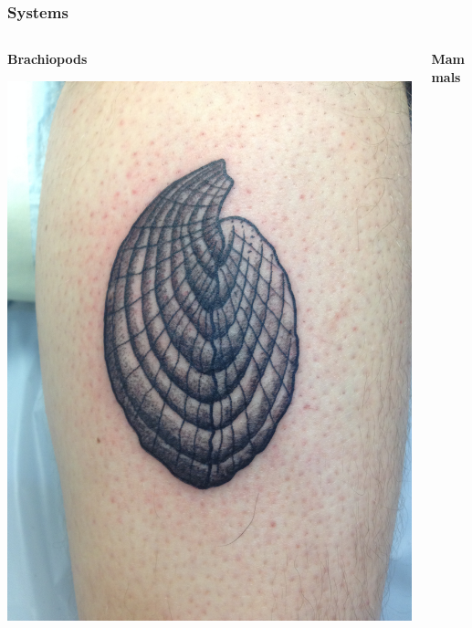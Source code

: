 \documentclass{beamer}
\begin{document}
\begin{frame}
  \frametitle{Systems}

  \begin{columns}
    \begin{column}{0.5\textwidth}
      \begin{center}
        \textbf{Brachiopods}

        \vspace{0.5cm}

        \includegraphics[height = 0.4\textheight, keepaspectratio = true]{figure/tattoo}
      \end{center}
    \end{column}
    \begin{column}{0.5\textwidth}
      \begin{center}
        \textbf{Mammals}

        \vspace{0.5cm}


\end{center}
\end{column}
\end{columns}
\end{frame}
\end{document}
